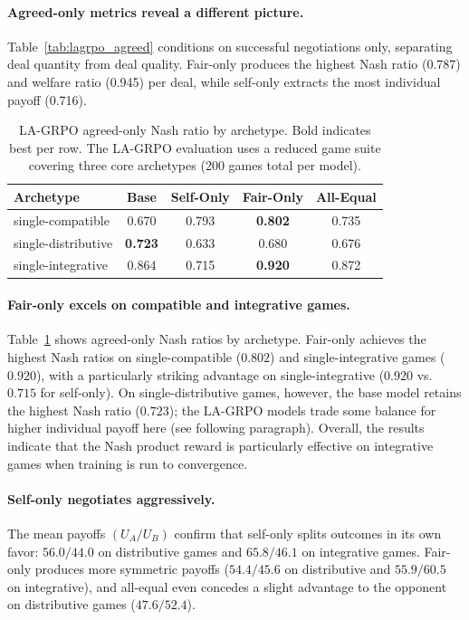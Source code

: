 \documentclass[12pt,a4paper]{article}
\renewcommand{\arraystretch}{1.25}
\begin{document}
\paragraph{Agreed-only metrics reveal a different picture.} Table~\ref{tab:lagrpo_agreed} conditions on successful negotiations only, separating deal quantity from deal quality. Fair-only produces the highest Nash ratio (0.787) and welfare ratio (0.945) per deal, while self-only extracts the most individual payoff (0.716).

\begin{table}[H]
\centering
\caption[LA-GRPO agreed-only Nash ratio by archetype.]{LA-GRPO agreed-only Nash ratio by archetype. Bold indicates best per row. The LA-GRPO evaluation uses a reduced game suite covering three core archetypes (200 games total per model).}
\label{tab:lagrpo_arch_nash}
\renewcommand{\arraystretch}{1.15}
\begin{tabular}{lcccc}
\toprule
\textbf{Archetype} & \textbf{Base} & \textbf{Self-Only} & \textbf{Fair-Only} & \textbf{All-Equal} \\
\midrule
single-compatible & 0.670 & 0.793 & \textbf{0.802} & 0.735 \\
single-distributive & \textbf{0.723} & 0.633 & 0.680 & 0.676 \\
single-integrative & 0.864 & 0.715 & \textbf{0.920} & 0.872 \\
\bottomrule
\end{tabular}
\end{table}

\paragraph{Fair-only excels on compatible and integrative games.} Table~\ref{tab:lagrpo_arch_nash} shows agreed-only Nash ratios by archetype. Fair-only achieves the highest Nash ratios on single-compatible ($0.802$) and single-integrative games ($0.920$), with a particularly striking advantage on single-integrative ($0.920$ vs.\ $0.715$ for self-only). On single-distributive games, however, the base model retains the highest Nash ratio ($0.723$); the LA-GRPO models trade some balance for higher individual payoff here (see following paragraph). Overall, the results indicate that the Nash product reward is particularly effective on integrative games when training is run to convergence.

\paragraph{Self-only negotiates aggressively.} The mean payoffs $(U_A / U_B)$ confirm that self-only splits outcomes in its own favor: $56.0/44.0$ on distributive games and $65.8/46.1$ on integrative games. Fair-only produces more symmetric payoffs ($54.4/45.6$ on distributive and $55.9/60.5$ on integrative), and all-equal even concedes a slight advantage to the opponent on distributive games ($47.6/52.4$).
\end{document}
